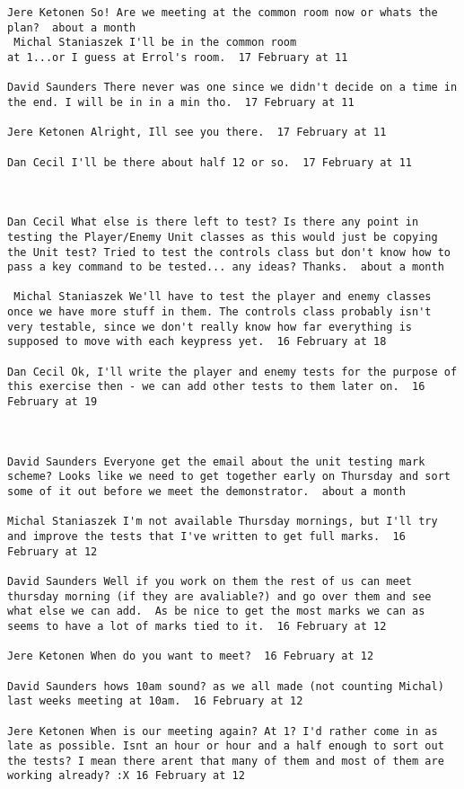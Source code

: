 \documentclass[10pt]{report}
\begin{document}
\begin{verbatim}
Jere Ketonen So! Are we meeting at the common room now or whats the
plan?  about a month 
 Michal Staniaszek I'll be in the common room
at 1...or I guess at Errol's room.  17 February at 11

David Saunders There never was one since we didn't decide on a time in
the end. I will be in in a min tho.  17 February at 11

Jere Ketonen Alright, Ill see you there.  17 February at 11

Dan Cecil I'll be there about half 12 or so.  17 February at 11



Dan Cecil What else is there left to test? Is there any point in
testing the Player/Enemy Unit classes as this would just be copying
the Unit test? Tried to test the controls class but don't know how to
pass a key command to be tested... any ideas? Thanks.  about a month

 Michal Staniaszek We'll have to test the player and enemy classes
once we have more stuff in them. The controls class probably isn't
very testable, since we don't really know how far everything is
supposed to move with each keypress yet.  16 February at 18

Dan Cecil Ok, I'll write the player and enemy tests for the purpose of
this exercise then - we can add other tests to them later on.  16
February at 19



David Saunders Everyone get the email about the unit testing mark
scheme? Looks like we need to get together early on Thursday and sort
some of it out before we meet the demonstrator.  about a month 

Michal Staniaszek I'm not available Thursday mornings, but I'll try
and improve the tests that I've written to get full marks.  16
February at 12

David Saunders Well if you work on them the rest of us can meet
thursday morning (if they are avaliable?) and go over them and see
what else we can add.  As be nice to get the most marks we can as
seems to have a lot of marks tied to it.  16 February at 12

Jere Ketonen When do you want to meet?  16 February at 12

David Saunders hows 10am sound? as we all made (not counting Michal)
last weeks meeting at 10am.  16 February at 12

Jere Ketonen When is our meeting again? At 1? I'd rather come in as
late as possible. Isnt an hour or hour and a half enough to sort out
the tests? I mean there arent that many of them and most of them are
working already? :X 16 February at 12


\end{verbatim}
\end{document}
